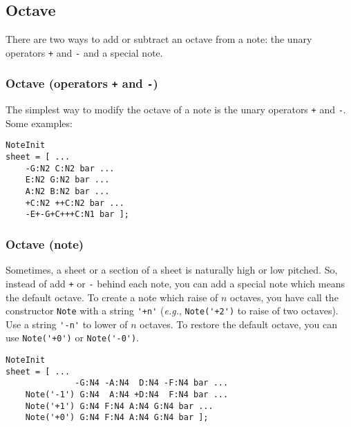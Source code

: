 \documentclass{article}
\begin{document}
\subsection{Octave}

There are two ways to add or subtract an octave from a note: the unary operators \lstinline!+! and \lstinline!-! and a special note.

\subsubsection{Octave (operators \lstinline!+! and \lstinline!-!)}

The simplest way to modify the octave of a note is the unary operators \lstinline!+! and \lstinline!-!. Some examples: \\

\begin{lstlisting}
NoteInit
sheet = [ ...
	-G:N2 C:N2 bar ...
	E:N2 G:N2 bar ...
	A:N2 B:N2 bar ...
	+C:N2 ++C:N2 bar ...
	-E+-G+C+++C:N1 bar ];
\end{lstlisting}

\subsubsection{Octave (note)}

Sometimes, a sheet or a section of a sheet is naturally high or low pitched. So, instead of add \lstinline!+! or \lstinline!-! behind each note, you can add a special note which means the default octave. To create a note which raise of $n$ octaves, you have call the constructor \lstinline!Note! with a string \lstinline!'+n'! (\emph{e.g.}, \lstinline!Note('+2')! to raise of two octaves). Use a string \lstinline!'-n'! to lower of $n$ octaves. To restore the default octave, you can use \lstinline!Note('+0')! or \lstinline!Note('-0')!. \\

\begin{lstlisting}
NoteInit
sheet = [ ...
	          -G:N4 -A:N4  D:N4 -F:N4 bar ...
	Note('-1') G:N4  A:N4 +D:N4  F:N4 bar ...
	Note('+1') G:N4 F:N4 A:N4 G:N4 bar ...
	Note('+0') G:N4 F:N4 A:N4 G:N4 bar ];
\end{lstlisting}
\end{document}
